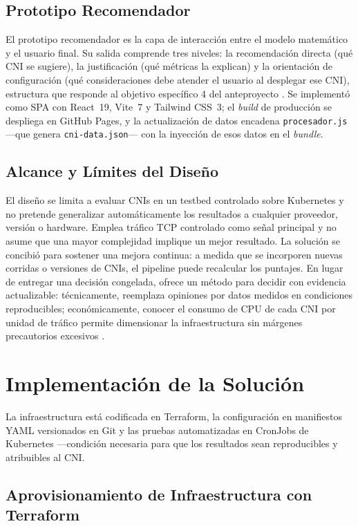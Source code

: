 \subsection{Prototipo Recomendador}

El prototipo recomendador es la capa de interacción entre el modelo matemático y el usuario final. Su salida comprende tres niveles: la recomendación directa (qué CNI se sugiere), la justificación (qué métricas la explican) y la orientación de configuración (qué consideraciones debe atender el usuario al desplegar ese CNI), estructura que responde al objetivo específico 4 del anteproyecto \cite{ref29}. Se implementó como SPA con React~19, Vite~7 y Tailwind CSS~3; el \emph{build} de producción se despliega en GitHub Pages, y la actualización de datos encadena \texttt{procesador.js} ---que genera \texttt{cni-data.json}--- con la inyección de esos datos en el \emph{bundle}.

\subsection{Alcance y Límites del Diseño}

El diseño se limita a evaluar CNIs en un testbed controlado sobre Kubernetes y no pretende generalizar automáticamente los resultados a cualquier proveedor, versión o hardware. Emplea tráfico TCP controlado como señal principal y no asume que una mayor complejidad implique un mejor resultado. La solución se concibió para sostener una mejora continua: a medida que se incorporen nuevas corridas o versiones de CNIs, el pipeline puede recalcular los puntajes. En lugar de entregar una decisión congelada, ofrece un método para decidir con evidencia actualizable: técnicamente, reemplaza opiniones por datos medidos en condiciones reproducibles; económicamente, conocer el consumo de CPU de cada CNI por unidad de tráfico permite dimensionar la infraestructura sin márgenes precautorios excesivos \cite{ref29}.

\section{Implementación de la Solución}

La infraestructura está codificada en Terraform, la configuración en manifiestos YAML versionados en Git y las pruebas automatizadas en CronJobs de Kubernetes ---condición necesaria para que los resultados sean reproducibles y atribuibles al CNI.

\subsection{Aprovisionamiento de Infraestructura con Terraform}

